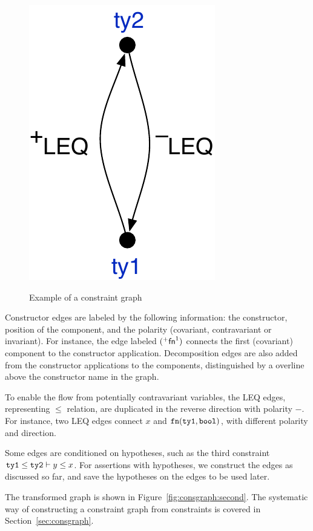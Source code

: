 \begin{figure}
\begin{center}
{    \includegraphics[height=\fh]{graph/hypograph}
    \label{fig:consgraph:third}
}
\end{center}
\caption{Example of a constraint graph}
\label{fig:consgraph}
\end{figure}

Constructor edges are labeled by the following information: the constructor,
position of the component, and the polarity (covariant, contravariant or
invariant). For instance, the edge labeled $(^{+}\textsf{fn}^{1})$
connects the first (covariant) component to the constructor
application.
%
Decomposition edges are also added from the constructor applications
to the components, distinguished by a overline above the constructor
name in the graph.

To enable the flow from potentially contravariant variables, the LEQ edges,
representing $\leq$ relation, are duplicated in the reverse direction with
polarity $-$. For instance, two LEQ edges connect $x$ and
$\mathtt{fn}(\mathtt{ty1},\mathtt{bool})$, with different polarity and direction.

Some edges are conditioned on hypotheses, such as the third constraint
$\mathtt{ty1} \leq \mathtt{ty2} \vdash y \leq x$. For assertions with
hypotheses, we construct the edges as discussed so far, and save the
hypotheses on the edges to be used later.

The transformed graph is shown in Figure~\ref{fig:consgraph:second}.
The systematic way of constructing a constraint graph from constraints
is covered in Section~\ref{sec:consgraph}.

